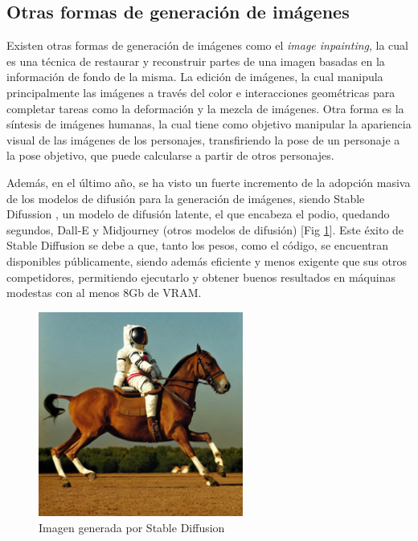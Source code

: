 \subsection{Otras formas de generación de imágenes}
Existen otras formas de generación de imágenes como el \textit{image inpainting}, la cual es una técnica de restaurar y reconstruir partes de una imagen basadas en la información de fondo de la misma. La edición de imágenes, la cual manipula principalmente las imágenes a través del color e interacciones geométricas para completar tareas como la deformación y la mezcla de imágenes. Otra forma es la síntesis de imágenes humanas, la cual tiene como objetivo manipular la apariencia visual de las imágenes de los personajes, transfiriendo la pose de un personaje a la pose objetivo, que puede calcularse a partir de otros personajes.

Además, en el último año, se ha visto un fuerte incremento de la adopción masiva de los modelos de difusión para la generación de imágenes, siendo Stable Difussion , un modelo de difusión latente, el que encabeza el podio, quedando segundos, Dall-E y Midjourney (otros modelos de difusión) [Fig \ref{fig:stable-diffusion}]. Este éxito de Stable Diffusion se debe a que, tanto los pesos, como el código, se encuentran disponibles públicamente, siendo además eficiente y menos exigente que sus otros competidores, permitiendo ejecutarlo y obtener buenos resultados en máquinas modestas con al menos 8Gb de VRAM.

\begin{figure}[ht!]
    \centering
    \includegraphics[width=0.6\textwidth]{Graphics/stable-diffusion.png}
    \caption{Imagen generada por Stable Diffusion}
    \label{fig:stable-diffusion}
\end{figure}

